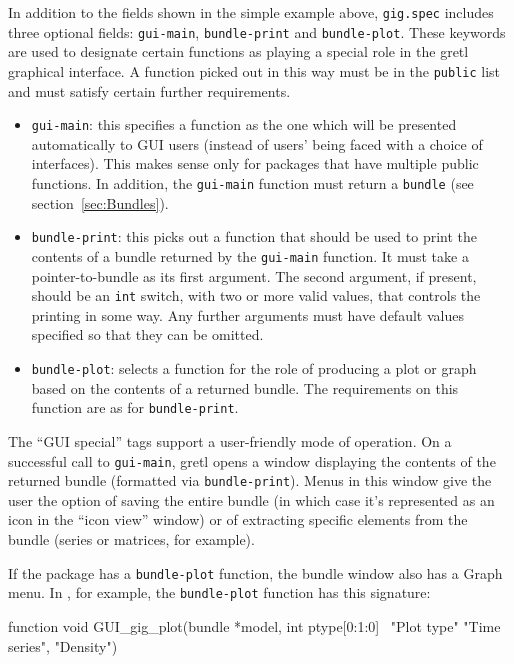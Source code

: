 In addition to the fields shown in the simple example above,
\texttt{gig.spec} includes three optional fields: \texttt{gui-main},
\texttt{bundle-print} and \texttt{bundle-plot}. These keywords are
used to designate certain functions as playing a special role in the
gretl graphical interface. A function picked out in this way
must be in the \texttt{public} list and must satisfy certain
further requirements.  
%
\begin{itemize}
\item \texttt{gui-main}: this specifies a function as the one which
  will be presented automatically to GUI users (instead of users'
  being faced with a choice of interfaces). This makes sense only for
  packages that have multiple public functions. In addition, the
  \texttt{gui-main} function must return a \texttt{bundle} (see
  section~\ref{sec:Bundles}).
\item \texttt{bundle-print}: this picks out a function that should be
  used to print the contents of a bundle returned by the
  \texttt{gui-main} function. It must take a pointer-to-bundle as its
  first argument. The second argument, if present, should be an
  \texttt{int} switch, with two or more valid values, that controls the
  printing in some way. Any further arguments must have default values
  specified so that they can be omitted.
\item \texttt{bundle-plot}: selects a function for the role of
  producing a plot or graph based on the contents of a returned
  bundle. The requirements on this function are as for 
  \texttt{bundle-print}.
\end{itemize}

The ``GUI special'' tags support a user-friendly mode of operation.
On a successful call to \texttt{gui-main}, gretl opens a 
window displaying the contents of the returned bundle (formatted
via \texttt{bundle-print}). Menus in this window give the user the
option of saving the entire bundle (in which case it's represented
as an icon in the ``icon view'' window) or of extracting specific
elements from the bundle (series or matrices, for example). 

If the package has a \texttt{bundle-plot} function, the bundle window
also has a \textsf{Graph} menu. In , for example, the
\texttt{bundle-plot} function has this signature:
%
\begin{code}
function void GUI_gig_plot(bundle *model, int ptype[0:1:0] \
                           "Plot type" {"Time series", "Density"})
\end{code}

